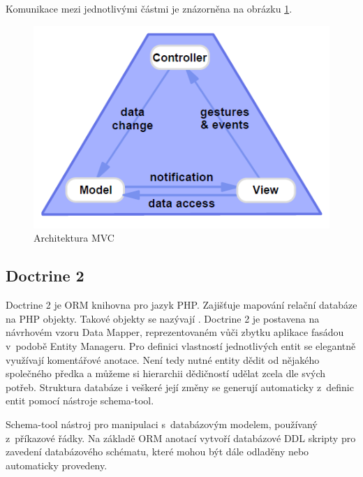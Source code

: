 \documentclass[thesis=B,czech]{FITthesis}[2012/06/26]
\begin{document}
	Komunikace mezi jednotlivými částmi je znázorněna na obrázku \ref{mvc_arch}.

	\begin{figure}
		\includegraphics[width=\textwidth]{mvc.png}
		\caption{Architektura MVC}\label{mvc_arch}
	\end{figure}
	
\subsection{Doctrine 2}
	Doctrine 2 je ORM knihovna pro jazyk PHP. Zajišťuje mapování relační databáze na PHP objekty. Takové objekty se nazývají . Doctrine 2 je postavena na návrhovém vzoru Data Mapper, reprezentovaném vůči zbytku aplikace fasádou v~podobě Entity Manageru. Pro definici vlastností jednotlivých entit se elegantně využívají komentářové anotace. Není tedy nutné entity dědit od nějakého společného předka a můžeme si hierarchii dědičností udělat zcela dle svých potřeb. Struktura databáze i veškeré její změny se generují automaticky z~definic entit pomocí nástroje schema-tool. \cite{doctrine2} 
	
	Schema-tool nástroj pro manipulaci s~databázovým modelem, používaný z~příkazové řádky. Na základě ORM anotací vytvoří databázové DDL skripty pro zavedení databázového schématu, které mohou být dále odladěny nebo automaticky provedeny.
	
\end{document}
